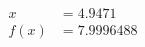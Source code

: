 \documentclass[preview]{standalone}
\begin{document}
\begin{align*}
x &= 4.9471\\f(x) &= 7.9996488
\end{align*}
\end{document}
